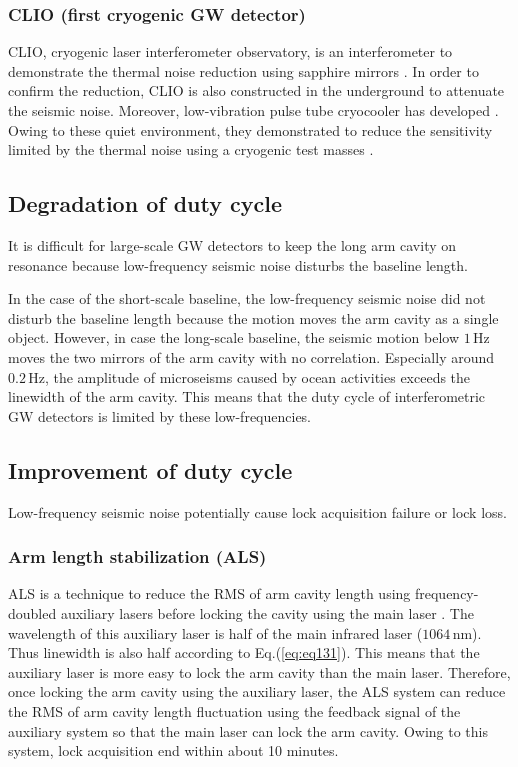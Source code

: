 \subsubsection{CLIO (first cryogenic GW detector)}
CLIO, cryogenic laser interferometer observatory, is an interferometer to demonstrate the thermal noise reduction using sapphire mirrors \cite{ohashi2003design}. In order to confirm the reduction, CLIO is also constructed in the underground to attenuate the seismic noise. Moreover, low-vibration pulse tube cryocooler has developed \cite{tomaru2004development}. Owing to these quiet environment, they demonstrated to reduce the sensitivity limited by the thermal noise using a cryogenic test masses \cite{uchiyama2012reduction}.


\newpage
\subsection{Degradation of duty cycle }
It is difficult for large-scale GW detectors to keep the long arm cavity on resonance because low-frequency seismic noise disturbs the baseline length.

In the case of the short-scale baseline, the low-frequency seismic noise did not disturb the baseline length because the motion moves the arm cavity as a single object. However, in case the long-scale baseline, the seismic motion below $1\,\mathrm{Hz}$ moves the two mirrors of the arm cavity with no correlation. Especially around $0.2\,\mathrm{Hz}$, the amplitude of microseisms caused by ocean activities exceeds the linewidth of the arm cavity. This means that the duty cycle of interferometric GW detectors is limited by these low-frequencies.

\subsection{Improvement of duty cycle}
Low-frequency seismic noise potentially cause lock acquisition failure or lock loss. 

\subsubsection{Arm length stabilization (ALS)}
ALS is a technique to reduce the RMS of arm cavity length using frequency-doubled auxiliary lasers before locking the cavity using the main laser \cite{mullavey2012arm,izumi2012multi}. The wavelength of this auxiliary laser is half of the main infrared laser ($1064\,\mathrm{nm}$). Thus linewidth is also half according to Eq.(\ref{eq:eq131}). This means that the auxiliary laser is more easy to lock the arm cavity than the main laser. Therefore, once locking the arm cavity using the auxiliary laser, the ALS system can reduce the RMS of arm cavity length fluctuation using the feedback signal of the auxiliary system so that the main laser can lock the arm cavity. Owing to this system, lock acquisition end within about 10 minutes.

